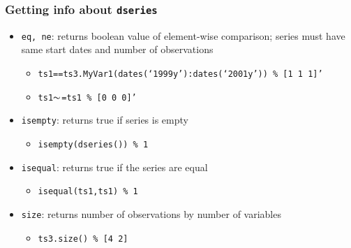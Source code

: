 \documentclass[10pt]{beamer}
\begin{document}
\begin{frame}[fragile,t]
  \frametitle{Getting info about \texttt{dseries}}
  \begin{itemize}
  \item \texttt{eq, ne}: returns boolean value of element-wise comparison; series must have same start dates and number of observations
    \begin{itemize}
    \item \texttt{ts1==ts3.MyVar1(dates(`1999y'):dates(`2001y')) \% [1 1 1]'}
    \item \texttt{ts1$\thicksim$=ts1 \% [0 0 0]'}
    \end{itemize}
  \item \texttt{isempty}: returns true if series is empty
    \begin{itemize}
    \item \texttt{isempty(dseries()) \% 1}
    \end{itemize}
  \item \texttt{isequal}: returns true if the series are equal
    \begin{itemize}
    \item \texttt{isequal(ts1,ts1) \% 1}
    \end{itemize}
  \item \texttt{size}: returns number of observations by number of variables
    \begin{itemize}
    \item \texttt{ts3.size() \% [4 2]}
    \end{itemize}
  \end{itemize}
\end{frame}
\end{document}
